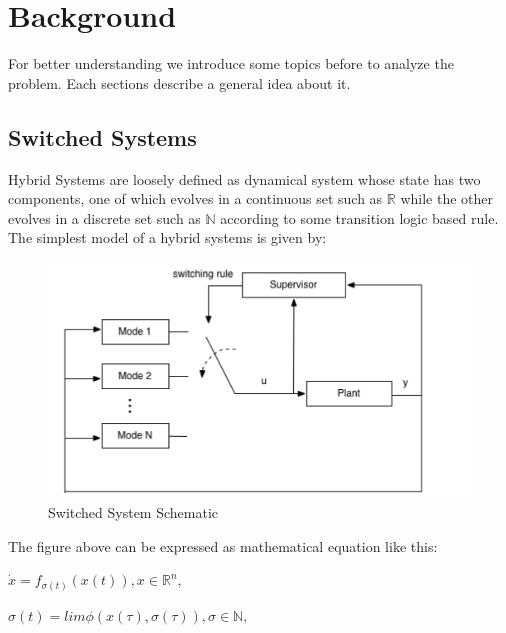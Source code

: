 \chapter{Background}
\label{ch:background}
For better understanding we introduce some topics before to analyze the problem. Each sections describe a general idea about it.

\section{Switched Systems}
Hybrid Systems are loosely defined as dynamical system whose state has two components, one of which evolves in a continuous set such as $\mathbb{R}$  while the other evolves in a discrete set such as $\mathbb{N}$ according to some transition logic based rule. The simplest model of a hybrid systems is given by: \citep{le2017improved}


\begin{figure}[!h]
    \begin{center}
        \includegraphics[width=\textwidth*4/5]{images/ss}
        \caption{Switched System Schematic}
    \end{center}
\end{figure}

\newpage
The figure above can be expressed as mathematical equation like this:
\begin{center}
    ${
    \dot x = f_{\sigma(t)}(x(t)), x \in \mathbb{R}^n,
    }$
    
    ${
    \sigma(t) = lim \phi(x(\tau),\sigma(\tau)), \sigma \in \mathbb{N},
    }$
\end{center}


